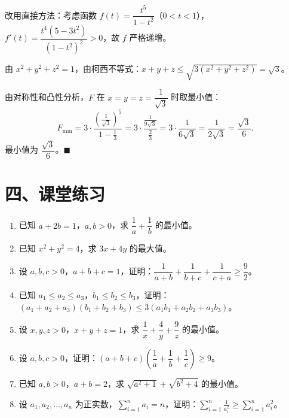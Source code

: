 \documentclass[12pt, a4paper]{ctexart}
\begin{document}
改用直接方法：考虑函数 $f(t) = \dfrac{t^5}{1-t^2}$（$0 < t < 1$），$f'(t) = \dfrac{t^4(5 - 3t^2)}{(1-t^2)^2} > 0$，故 $f$ 严格递增。

由 $x^2 + y^2 + z^2 = 1$，由柯西不等式：$x + y + z \leqslant \sqrt{3(x^2 + y^2 + z^2)} = \sqrt{3}$。

由对称性和凸性分析，$F$ 在 $x = y = z = \dfrac{1}{\sqrt{3}}$ 时取最小值：
\[
  F_{\min} = 3 \cdot \frac{\left(\frac{1}{\sqrt{3}}\right)^5}{1 - \frac{1}{3}} = 3 \cdot \frac{\frac{1}{9\sqrt{3}}}{\frac{2}{3}} = 3 \cdot \frac{1}{6\sqrt{3}} = \frac{1}{2\sqrt{3}} = \frac{\sqrt{3}}{6}.
\]
最小值为 $\boxed{\dfrac{\sqrt{3}}{6}}$。\hfill $\blacksquare$

\section*{\textcolor{tipgreen}{四、课堂练习}}

\begin{enumerate}[leftmargin=2em, label=\textbf{\arabic*.}]

\item 已知 $a + 2b = 1$，$a, b > 0$，求 $\dfrac{1}{a} + \dfrac{1}{b}$ 的最小值。

\item 已知 $x^2 + y^2 = 4$，求 $3x + 4y$ 的最大值。

\item 设 $a, b, c > 0$，$a + b + c = 1$，证明：$\dfrac{1}{a+b} + \dfrac{1}{b+c} + \dfrac{1}{c+a} \geqslant \dfrac{9}{2}$。

\item 已知 $a_1 \leqslant a_2 \leqslant a_3$，$b_1 \leqslant b_2 \leqslant b_3$，证明：$(a_1 + a_2 + a_3)(b_1 + b_2 + b_3) \leqslant 3(a_1 b_1 + a_2 b_2 + a_3 b_3)$。

\item 设 $x, y, z > 0$，$x + y + z = 1$，求 $\dfrac{1}{x} + \dfrac{4}{y} + \dfrac{9}{z}$ 的最小值。

\item 设 $a, b, c > 0$，证明：$(a + b + c)\!\left(\dfrac{1}{a} + \dfrac{1}{b} + \dfrac{1}{c}\right) \geqslant 9$。

\item 已知 $a, b > 0$，$a + b = 2$，求 $\sqrt{a^2 + 1} + \sqrt{b^2 + 4}$ 的最小值。

\item 设 $a_1, a_2, \ldots, a_n$ 为正实数，$\displaystyle\sum_{i=1}^n a_i = n$，证明：$\displaystyle\sum_{i=1}^n \frac{1}{a_i^2} \geqslant \displaystyle\sum_{i=1}^n a_i^2$。

\end{enumerate}
\end{document}
